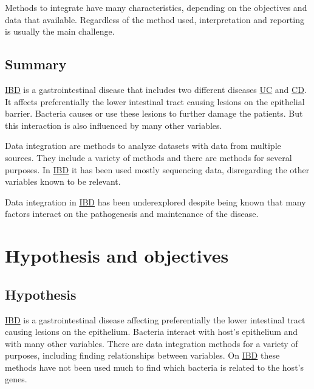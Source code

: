 \documentclass[
  12pt,
  a4paper,
  twoside,
  openright]{book}
\begin{document}
Methods to integrate have many characteristics, depending on the objectives and data that available.
Regardless of the method used, interpretation and reporting is usually the main challenge.

\hypertarget{summary}{%
\section{Summary}\label{summary}}

\protect\hyperlink{acronyms_IBD}{IBD} is a gastrointestinal disease that includes two different diseases \protect\hyperlink{acronyms_UC}{UC} and \protect\hyperlink{acronyms_CD}{CD}.
It affects preferentially the lower intestinal tract causing lesions on the epithelial barrier.
Bacteria causes or use these lesions to further damage the patients.
But this interaction is also influenced by many other variables.

Data integration are methods to analyze datasets with data from multiple sources.
They include a variety of methods and there are methods for several purposes.
In \protect\hyperlink{acronyms_IBD}{IBD} it has been used mostly sequencing data, disregarding the other variables known to be relevant.

Data integration in \protect\hyperlink{acronyms_IBD}{IBD} has been underexplored despite being known that many factors interact on the pathogenesis and maintenance of the disease.

\hypertarget{hypothesis-and-objectives}{%
\chapter{Hypothesis and objectives}\label{hypothesis-and-objectives}}

\hypertarget{hypothesis}{%
\section{Hypothesis}\label{hypothesis}}

\protect\hyperlink{acronyms_IBD}{IBD} is a gastrointestinal disease affecting preferentially the lower intestinal tract causing lesions on the epithelium.
Bacteria interact with host's epithelium and with many other variables.
There are data integration methods for a variety of purposes, including finding relationships between variables.
On \protect\hyperlink{acronyms_IBD}{IBD} these methods have not been used much to find which bacteria is related to the host's genes.
\end{document}
